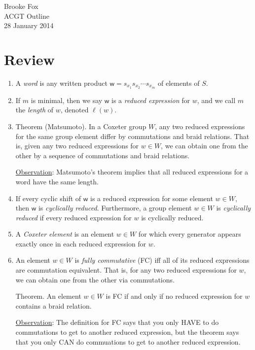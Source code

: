 \documentclass{article}
\theoremstyle{definition}
\theoremstyle{theorem}
\begin{document}
\noindent Brooke Fox \\
ACGT Outline \\
28 January 2014 \\

\section{Review}
\begin{enumerate}[label=(\alph*)]
\item A \emph{word} is any written product $\textsf{w} = s_{x_1} s_{x_2} \cdots s_{x_m}$ of elements of $S$.
\item If $m$ is minimal, then we say $\textsf{w}$ is a \emph{reduced expression} for $w$, and we call $m$ the \emph{length} of $w$, denoted $\ell(w)$.

\item Theorem (Matsumoto). In a Coxeter group $W$, any two reduced expressions for the same group element differ by commutations and braid relations.
	That is, given any two reduced expressions for $w \in W$, we can obtain one from the other by a sequence of commutations and braid relations.
	
	\underline{Observation}: Matsumoto's theorem implies that all reduced expressions for a word have the same length.
	
\item If every cyclic shift of $\textsf{w}$ is a reduced expression for some element $w \in W$, then $\textsf{w}$ is \emph{cyclically reduced}. Furthermore, a group element $w \in W$ is \emph{cyclically reduced} if every reduced expression for $w$ is cyclically reduced.

\item A \emph{Coxeter element} is an element $w \in W$ for which every generator appears exactly once in each reduced expression for $w$.

\item An element $w \in W$ is \emph{fully commutative} (FC) iff all of its reduced expressions are commutation equivalent. That is, for any two reduced expressions for $w$, we can obtain one from the other via commutations.

    Theorem. An element $w \in W$ is FC if and only if no reduced expression for $w$ contains a braid relation.

	\underline{Observation}: The definition for FC says that you only HAVE to do commutations to get to another reduced expression, but the theorem says that you only CAN do commuations to get to another reduced expression.
	

\end{enumerate}
\end{document}
